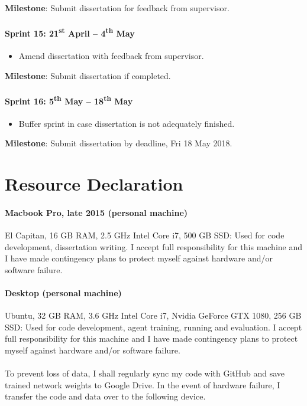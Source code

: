 \documentclass[a4paper]{article}
\begin{document}
\textbf{Milestone}: Submit dissertation for feedback from supervisor.

\paragraph{Sprint 15: 21\textsuperscript{st} April -- 4\textsuperscript{th} May}
\begin{itemize}
\item Amend dissertation with feedback from supervisor.
\end{itemize}

\textbf{Milestone}: Submit dissertation if completed.

\paragraph{Sprint 16: 5\textsuperscript{th} May -- 18\textsuperscript{th} May}
\begin{itemize}
\item Buffer sprint in case dissertation is not adequately finished.
\end{itemize}

\textbf{Milestone}: Submit dissertation by deadline, Fri 18 May 2018.


\section*{Resource Declaration}

\paragraph{Macbook Pro, late 2015 (personal machine)} El Capitan, 16 GB RAM, 2.5 GHz Intel Core i7, 500 GB SSD: Used for code development, dissertation writing. I accept full responsibility for this machine and I have made contingency plans to protect myself against hardware and/or software failure.

\paragraph{Desktop (personal machine)} Ubuntu, 32 GB RAM, 3.6 GHz Intel Core i7, Nvidia GeForce GTX 1080, 256 GB SSD: Used for code development, agent training, running and evaluation. I accept full responsibility for this machine and I have made contingency plans to protect myself against hardware and/or software failure.

\paragraph{}To prevent loss of data, I shall regularly sync my code with GitHub and save trained network weights to Google Drive. In the event of hardware failure, I transfer the code and data over to the following device.
\end{document}
